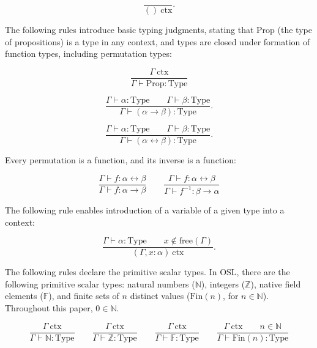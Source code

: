 \documentclass[11pt]{article}
\begin{document}
\begin{equation}
	\frac{}{()\ \text{ctx}}.
\end{equation}

The following rules introduce basic typing judgments, stating that
Prop (the type of propositions) is a type in any context, and
types are closed under formation of function types, including permutation types:

\begin{equation}
	\frac{\Gamma\ \text{ctx}}{\Gamma \vdash \text{Prop} : \text{Type}}
\end{equation}

\begin{equation}
	\frac{\Gamma \vdash \alpha : \text{Type} \qquad
	      \Gamma \vdash \beta : \text{Type}}
	      {\Gamma \vdash (\alpha \to \beta) : \text{Type}}.
\end{equation}

\begin{equation}
	\frac{\Gamma \vdash \alpha : \text{Type} \qquad
	      \Gamma \vdash \beta : \text{Type}}
	      {\Gamma \vdash (\alpha \leftrightarrow \beta) : \text{Type}}.
\end{equation}

Every permutation is a function, and its inverse is a function:

\begin{equation}
	\frac{\Gamma \vdash f : \alpha \leftrightarrow \beta}
	{\Gamma \vdash f : \alpha \to \beta}
	\qquad
	\frac{\Gamma \vdash f : \alpha \leftrightarrow \beta}
	{\Gamma \vdash f^{-1} : \beta \to \alpha}
\end{equation}


The following rule enables introduction of a variable of a given
type into a context:

\begin{equation}
	\frac{\Gamma \vdash \alpha : \text{Type}
	\qquad x \notin \text{free}(\Gamma)}
	{(\Gamma, x : \alpha)\ \text{ctx}}.
\end{equation}

The following rules declare the primitive scalar types.
In OSL, there are the following primitive scalar types:
natural numbers ($\mathbb{N}$), integers ($\mathbb{Z}$), native field elements ($\mathbb{F}$),
and finite sets of $n$ distinct values ($\text{Fin}(n)$,
for $n \in \mathbb{N}$). Throughout this paper, $0 \in \mathbb{N}$.

\begin{equation}
	\frac{\Gamma\ \text{ctx}}{\Gamma \vdash \mathbb{N} : \text{Type}}
	\qquad
	\frac{\Gamma\ \text{ctx}}{\Gamma \vdash \mathbb{Z} : \text{Type}}
	\qquad
	\frac{\Gamma\ \text{ctx}}{\Gamma \vdash \mathbb{F} : \text{Type}}
	\qquad
	\frac{\Gamma\ \text{ctx} \qquad n \in \mathbb{N}}{\Gamma \vdash \text{Fin}(n) : \text{Type}}
\end{equation}
\end{document}
